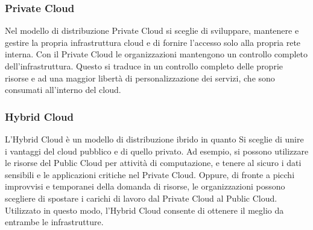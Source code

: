 \subsubsection{Private Cloud}
Nel modello di distribuzione Private Cloud si sceglie di sviluppare, mantenere e gestire la propria infrastruttura cloud e di fornire l'accesso solo alla propria rete interna. Con il Private Cloud le organizzazioni mantengono un controllo completo dell'infrastruttura. Questo si traduce in un controllo completo delle proprie risorse e ad una maggior libertà di personalizzazione dei servizi, che sono consumati all'interno del cloud.

\subsubsection{Hybrid Cloud}
L’Hybrid Cloud è un modello di distribuzione ibrido in quanto 
Si sceglie di unire i vantaggi del cloud pubblico e di quello privato.
Ad esempio, si possono utilizzare le risorse del Public Cloud per attività di computazione, e tenere al sicuro i dati sensibili e le applicazioni critiche nel Private Cloud. Oppure, di fronte a picchi improvvisi e temporanei della domanda di risorse, le organizzazioni possono scegliere di spostare i carichi di lavoro dal Private Cloud al Public Cloud.
Utilizzato in questo modo, l’Hybrid Cloud consente di ottenere il meglio da entrambe le infrastrutture.